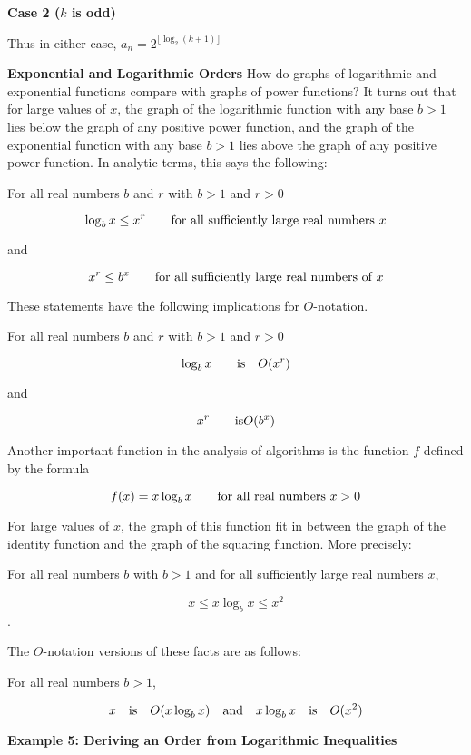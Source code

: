 {\bf Case 2 ($k$ is odd)}

\vskip 2mm
Thus in either case, $a_n=2^{\lfloor\log_2(k+1)\rfloor}$

\filbreak
\vskip 1cm
{\bf Exponential and Logarithmic Orders}
\vskip 3mm
How do graphs of logarithmic and exponential functions compare with graphs of power functions? It turns out that for large values of $x$, the graph of the logarithmic function with any base $b>1$ lies below the graph of any positive power function, and the graph of the exponential function with any base $b>1$ lies above the graph of any positive power function. In analytic terms, this says the following:

\vskip 2mm
For all real numbers $b$ and $r$ with $b>1$ and $r>0$

$$\log_b x\leq x^r\qquad\hbox{for all sufficiently large real numbers $x$}$$

and

$$x^r\leq b^x\qquad\hbox{for all sufficiently large real numbers of $x$}$$

These statements have the following implications for $O$-notation.

\vskip 3mm
For all real numbers $b$ and $r$ with $b>1$ and $r>0$

$$\log_bx\qquad\hbox{is}\quad O(x^r)$$

and

$$x^r\qquad\hbox{is}O(b^x)$$

\vskip 2mm
Another important function in the analysis of algorithms is the function $f$ defined by the formula

$$f(x)=x\log_bx\qquad\hbox{for all real numbers $x>0$}$$

For large values of $x$, the graph of this function fit in between the graph of the identity function and the graph of the squaring function. More precisely:

\vskip 2mm
For all real numbers $b$ with $b>1$ and for all sufficiently large real numbers $x$,

$$x\leq x\log_bx\leq x^2$$.

\vskip 2mm

The $O$-notation versions of these facts are as follows:

\vskip 2mm
For all real numbers $b>1$,

$$x\quad\hbox{is}\quad O(x\log_bx)\quad\hbox{and}\quad x\log_bx\quad\hbox{is}\quad O(x^2)$$

\filbreak
\vskip 1cm
{\bf Example 5: Deriving an Order from Logarithmic Inequalities}

